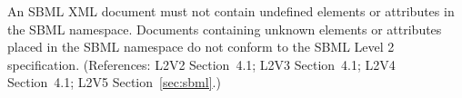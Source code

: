 An SBML XML document must not contain undefined elements or
attributes in the SBML namespace.  Documents containing unknown
elements or attributes placed in the SBML namespace do not conform
to the SBML Level 2 specification.  (References: L2V2 Section~4.1;
L2V3 Section~4.1; L2V4 Section~4.1; L2V5 Section~\ref{sec:sbml}.)
